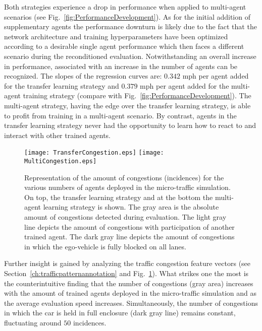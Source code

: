 \documentclass{article}
\begin{document}
Both strategies experience a drop in performance when applied to multi-agent scenarios (see Fig.~\ref{fig:PerformanceDevelopment}). As for the initial addition of supplementary agents the performance downturn is likely due to the fact that the network architecture and training hyperparameters have been optimized according to a desirable single agent performance which then faces a different scenario during the reconditioned evaluation.          
Notwithstanding an overall increase in performance, associated with an increase in the number of agents can be recognized. The slopes of the regression curves are: $0.342$ mph per agent added for the transfer learning strategy and  $0.379$ mph per agent added for the multi-agent training strategy (compare with Fig.~\ref{fig:PerformanceDevelopment}). The multi-agent strategy, having the edge over the transfer learning strategy, is able to profit from training in a multi-agent scenario. By contrast, agents in the transfer learning strategy never had the opportunity to learn how to react to and interact with other trained agents. 

\begin{figure}[ht]
	\centering
	\texttt{[image: TransferCongestion.eps]}
	\centering
	\texttt{[image: MultiCongestion.eps]}
	
	\caption{Representation of the amount of congestions (incidences) for the various numbers of agents deployed in the micro-traffic simulation. On top, the transfer learning strategy and at the bottom the multi-agent learning strategy is shown. The gray area is the absolute amount of congestions detected during evaluation. The light gray line depicts the amount of congestions with participation of another trained agent. The dark gray line depicts the amount of congestions in which the ego-vehicle is fully blocked on all lanes.}
	
	\label{fig:CongestionDevelopment}
\end{figure}
 
Further insight is gained by analyzing the traffic congestion feature vectors (see Section~\ref{ch:trafficpatternannotation} and Fig.~\ref{fig:CongestionDevelopment}). What strikes one the most is the counterintuitive finding that the number of congestions (gray area) increases with the amount of trained agents deployed in the micro-traffic simulation and as the average evaluation speed increases. Simultaneously, the number of congestions in which the car is held in full enclosure (dark gray line) remains constant, fluctuating around $50$ incidences. 
\end{document}
